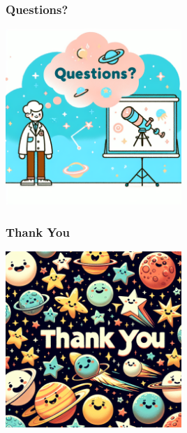\documentclass{beamer}
\begin{document}
\begin{frame}
    \frametitle{Questions?}
    \centering
    \includegraphics[width=0.5\textwidth]{./images/questions.png}
\end{frame}

\begin{frame}
    \frametitle{Thank You}
    \centering
    \includegraphics[width=0.5\textwidth]{./images/thank_you.png}
\end{frame}
\end{document}
